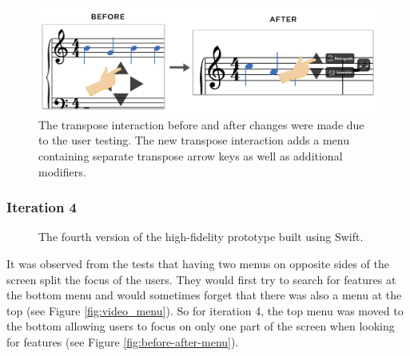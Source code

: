 
				\begin{figure}[h]
					\centering
					\includegraphics[scale=0.25]{figures/before-after-transpose}
				    \caption{The transpose interaction before and after changes were made due to the user testing. The new transpose interaction adds a menu containing separate transpose arrow keys as well as additional modifiers.}
				    \label{fig:before-after-transpose}
				\end{figure}

			\subsubsection{Iteration 4}

				\begin{figure}[H]
					\centering
				    \caption{The fourth version of the high-fidelity prototype built using Swift.}
				    \label{fig:flow_it4}
				\end{figure} 

				It was observed from the tests that having two menus on opposite sides of the screen split the focus of the users. They would first try to search for features at the bottom menu and would sometimes forget that there was also a menu at the top (see Figure \ref{fig:video_menu}). So for iteration 4, the top menu was moved to the bottom allowing users to focus on only one part of the screen when looking for features (see Figure \ref{fig:before-after-menu}). 

